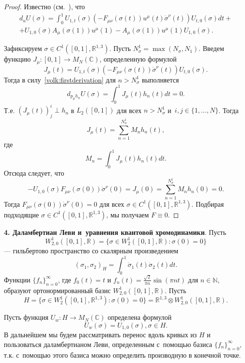 \begin{proof}
Известно (см.~\cite{volkov:bib:AGV}), что
\begin{multline}
\label{volk:firstderivation}
d_{u}U(\sigma)=\int_0^1U_{1,t}(\sigma)(-F_{\mu \nu}(\sigma(t))u^\mu(t)\dot{\sigma}^\nu(t))U_{t, 0}(\sigma)dt
+\\+U_{1, 0}(\sigma)A_\mu(\sigma(1))u^\mu(1)-A_\mu(\sigma(1))u^\mu(1)U_{1, 0}(\sigma).
\end{multline}

Зафиксируем $\sigma\in C^1([0, 1],\mathbb{R}^{1,3})$. 
Пусть $N^1_\sigma=\max(N_\sigma, N_1)$.
Введем функцию $J_\mu\colon [0, 1]\to M_N(\mathbb{C})$,
определенную формулой
$$J_\mu(t)=U_{1,t}(\sigma)(-F_{\mu \nu}(\sigma(t))\dot{\sigma}^\nu(t))U_{t, 0}(\sigma).$$
Тогда в силу~\eqref{volk:firstderivation} для $n>N^1_\sigma$ выполняется
 $$
 d_{p_\mu h_n}U(\sigma)=\int_0^1J_\mu(t)h_n(t)dt=0.
 $$
Т.е. $(J_\mu(t))^i_j\perp h_n$ в $L_2([0, 1])$ для всех  $n>N^1_\sigma$ и~$i, j\in\{1, \ldots, N\}$.
Тогда $$J_\mu(t)=\sum_{n=1}^{N^1_\sigma}M_nh_n(t),$$ где 
$$M_n=\int_0^1J_\mu(t)h_n(t)dt.$$
Отсюда следует, что
$$-U_{1, 0}(\sigma)F_{\mu \nu}(\sigma(0))\dot{\sigma}^\nu(0)=J_\mu(0)=\sum_{n=1}^{N^1_\sigma}M_nh_n(0)=0.$$
Тогда   $F_{\mu \nu}(\sigma(0))\dot{\sigma}^\nu(0)=0$ для всех $\sigma\in C^1([0, 1],\mathbb{R}^{1,3})$.
Подбирая подходящие $\sigma \in C^1([0, 1],\mathbb{R}^{1,3})$, мы получаем $F\equiv0$.
\end{proof}

\smallskip


{\bf 4. Даламбертиан Леви и~уравнения квантовой хромодинамики}.
Пусть $$W^1_{2, 0}([0, 1],\mathbb{R})=\{\sigma\in W^1_2([0, 1],\mathbb{R})\colon \sigma(0)=0\}$$ ---
гильбертово пространство  со скалярным произведением
$$(\sigma_1,\sigma_2)_H=\int_0^1\dot{\sigma}_1(t)\dot{\sigma}_2(t)dt.$$
Функции $\{f_n\}_{n=0}^\infty$, где  $f_0(t)=t$ и
 $f_n(t)=\frac {\sqrt2} {\pi n}\sin(\pi n t)$ для $n\in\mathbb{N}$, образуют ортонормированный базис
 $W^1_{2, 0}([0, 1],\mathbb{R})$.
Пусть $$H=\{\sigma\in W^1_2([0, 1],\mathbb{R}^{1,3})\colon \sigma(0)=0\}=\mathbb{R}^{1,3}\otimes W^1_{2, 0}([0, 1],\mathbb{R}).$$


Пусть функция $U_w\colon H\to M_N(\mathbb{C})$ определена формулой $$U_w(\sigma)=U_{1, 0}(\sigma), \sigma \in H.$$
В дальнейшем мы будем рассматривать перенос вдоль кривых из $H$ и
 пользоваться даламбертианом Леви, определенным с~помощью базиса $\{f_n\}_{n=0}^\infty$, т.к. с~помощью этого базиса можно
 определить производную в конечной точке.

